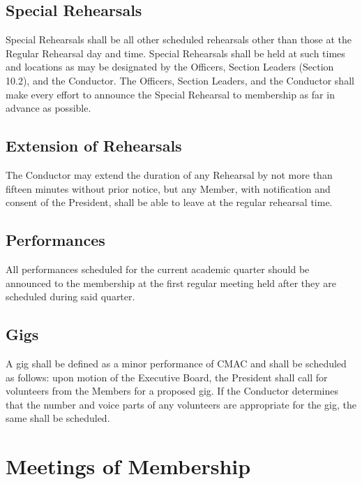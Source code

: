 \documentclass{article}
\begin{document}
\subsection{Special Rehearsals}

Special Rehearsals shall be all other scheduled rehearsals other than
those at the Regular Rehearsal day and time. Special Rehearsals shall
be held at such times and locations as may be designated by the Officers,
Section Leaders (Section 10.2), and the Conductor. The Officers, Section Leaders, and the Conductor shall make every effort to announce the Special Rehearsal to membership as far in advance as possible.

\subsection{Extension of Rehearsals}

The Conductor may extend the duration of any Rehearsal by not more
than fifteen minutes without prior notice, but any Member, with notification
and consent of the President, shall be able to leave at the regular
rehearsal time.

\subsection{Performances}

All performances scheduled for the current academic quarter should
be announced to the membership at the first regular meeting held after
they are scheduled during said quarter.

\subsection{Gigs}

A gig shall be defined as a minor performance of CMAC and shall be
scheduled as follows: upon motion of the Executive Board, the President
shall call for volunteers from the Members for a proposed gig. If
the Conductor determines that the number and voice parts of any volunteers
are appropriate for the gig, the same shall be scheduled.

\section{Meetings of Membership}

\end{document}
